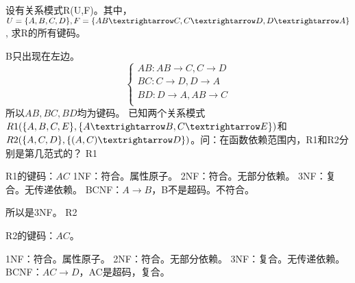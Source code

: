 \documentclass{ctexart}
\author{卢雨轩 19071125}
\DeclarePairedDelimiter{\set}{\{}{\}}
\begin{document}
\maketitle
\begin{outline}[enumerate]
    \1 设有关系模式R(U,F)。其中，$U=\set{A, B, C, D},F=\set{AB→C,  C→D,  D→A}$, 求R的所有键码。

        B只出现在左边。
        \begin{equation*}
            \begin{cases}
            AB: AB \to C, C \to D \\
            BC: C \to D, D \to A \\
            BD: D \to A, AB \to C \\
            \end{cases}
        \end{equation*}
        所以$AB,BC,BD$均为键码。
    \1 已知两个关系模式$R1(\set{A,B,C,E}, \set{A→B,C→E})$和$R2(\set{A,C,D}, \set{(A,C)→D})$。问：在函数依赖范围内，R1和R2分别是第几范式的？
        \2 R1

            R1的键码：$AC$
            \3 1NF：符合。属性原子。
            \3 2NF：符合。无部分依赖。
            \3 3NF：复合。无传递依赖。
            \3 BCNF：$A \to B$，B不是超码。不符合。

            所以是3NF。
        \2 R2

            R2的键码：$AC$。


            \3 1NF：符合。属性原子。
            \3 2NF：符合。无部分依赖。
            \3 3NF：复合。无传递依赖。
            \3 BCNF：$AC \to D$，AC是超码，复合。


\end{outline}
\end{document}
